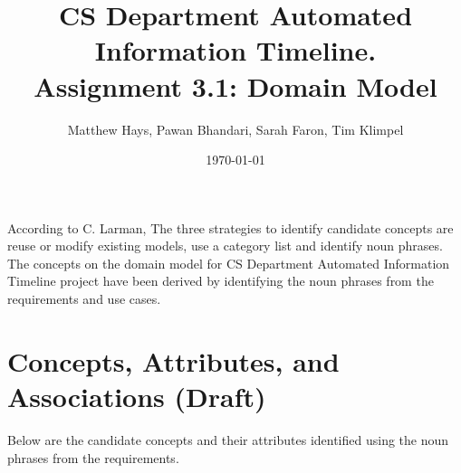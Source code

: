 \documentclass{article}
\title{CS Department Automated Information Timeline. \\ Assignment 3.1: Domain Model}
\date{\today}
\author{Matthew Hays, Pawan Bhandari, Sarah Faron, Tim Klimpel}
\begin{document}
\maketitle
\newpage
\tableofcontents
\listoffigures
\newpage

According to C. Larman, The three strategies to identify candidate concepts are reuse or modify existing models, use a category list and identify noun phrases. The concepts on the domain model for CS Department Automated Information Timeline project have been derived by identifying the noun phrases from the requirements and use cases.

\section{Concepts, Attributes, and Associations (Draft)}
Below are the candidate concepts and their attributes identified using the noun phrases from the requirements.\\
\end{document}
